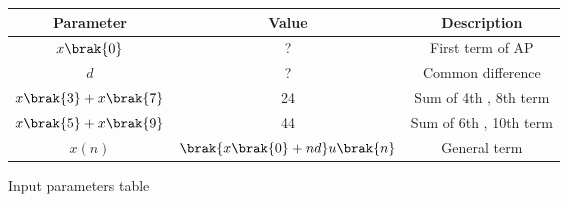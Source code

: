 \centering
\begin{tabular}{|c|c|c|}
        \hline
        \textbf{Parameter} & \textbf{Value} & \textbf{Description} \\
        \hline
        $x\brak{0}$ & ? & First term of AP \\
	\hline
	$d$ & ? & Common difference \\
        \hline
        $x\brak{3} + x\brak{7}$ & 24 & Sum of 4th , 8th term \\
        \hline
	$x\brak{5} + x\brak{9}$ & 44 & Sum of 6th , 10th term \\
	\hline
        $x(n)$ & $\brak{x\brak{0} + nd}u\brak{n}$ & General term \\
        \hline
\end{tabular}
\caption{Input parameters table}
\label{tab:10.5.2.18.1}


